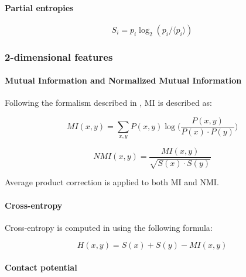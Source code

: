         \paragraph{Partial entropies}


            \begin{equation}
                S_i = p_i \log_2 (p_i / \langle p_i \rangle)
            \end{equation}

    \subsubsection{2-dimensional features}

        \paragraph{Mutual Information and Normalized Mutual Information}

            Following the formalism described in \cite{Michel383133}, MI is described as:

            \begin{equation}
                MI(x, y) = \sum\limits_{x, y} P(x, y) \log \Big( \frac{P(x, y)}{P(x) \cdot P(y)} \Big)
            \end{equation}

            \begin{equation}
                NMI(x, y) = \frac{MI(x, y)}{\sqrt{S(x) \cdot S(y)}}
            \end{equation}

            Average product correction is applied to both MI and NMI.

        \paragraph{Cross-entropy}

            Cross-entropy is computed in \cite{Michel383133} using the following formula:

            \begin{equation}
                H(x, y) = S(x) + S(y) - MI(x, y)
            \end{equation}

        \paragraph{Contact potential}

